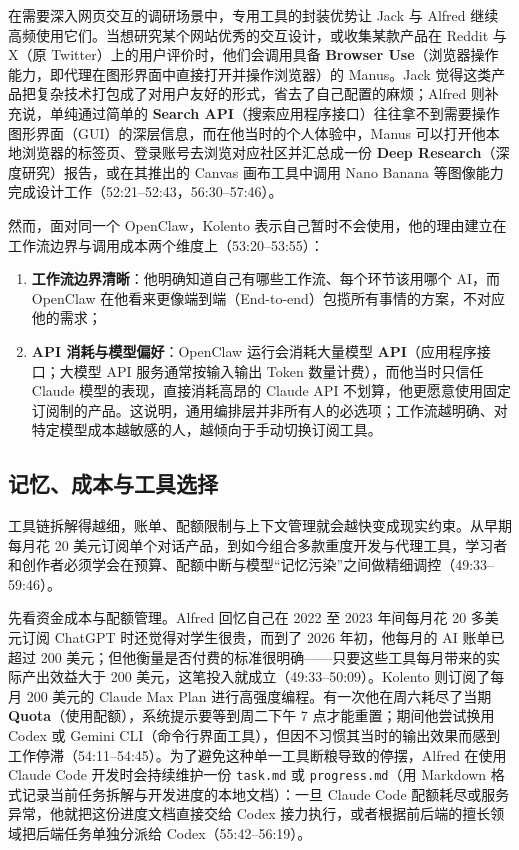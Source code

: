 \documentclass[UTF8,a4paper,11pt,fontset=fandol]{ctexart}
\begin{document}
在需要深入网页交互的调研场景中，专用工具的封装优势让 Jack 与 Alfred 继续高频使用它们。当想研究某个网站优秀的交互设计，或收集某款产品在 Reddit 与 X（原 Twitter）上的用户评价时，他们会调用具备 \textbf{Browser Use}（浏览器操作能力，即代理在图形界面中直接打开并操作浏览器）的 Manus。Jack 觉得这类产品把复杂技术打包成了对用户友好的形式，省去了自己配置的麻烦；Alfred 则补充说，单纯通过简单的 \textbf{Search API}（搜索应用程序接口）往往拿不到需要操作图形界面（GUI）的深层信息，而在他当时的个人体验中，Manus 可以打开他本地浏览器的标签页、登录账号去浏览对应社区并汇总成一份 \textbf{Deep Research}（深度研究）报告，或在其推出的 Canvas 画布工具中调用 Nano Banana 等图像能力完成设计工作（52:21–52:43，56:30–57:46）。

然而，面对同一个 OpenClaw，Kolento 表示自己暂时不会使用，他的理由建立在工作流边界与调用成本两个维度上（53:20–53:55）：
\begin{enumerate}
\item \textbf{工作流边界清晰}：他明确知道自己有哪些工作流、每个环节该用哪个 AI，而 OpenClaw 在他看来更像端到端（End-to-end）包揽所有事情的方案，不对应他的需求；
\item \textbf{API 消耗与模型偏好}：OpenClaw 运行会消耗大量模型 \textbf{API}（应用程序接口；大模型 API 服务通常按输入输出 Token 数量计费），而他当时只信任 Claude 模型的表现，直接消耗高昂的 Claude API 不划算，他更愿意使用固定订阅制的产品。这说明，通用编排层并非所有人的必选项；工作流越明确、对特定模型成本越敏感的人，越倾向于手动切换订阅工具。
\end{enumerate}

\subsection{记忆、成本与工具选择}
工具链拆解得越细，账单、配额限制与上下文管理就会越快变成现实约束。从早期每月花 20 美元订阅单个对话产品，到如今组合多款重度开发与代理工具，学习者和创作者必须学会在预算、配额中断与模型“记忆污染”之间做精细调控（49:33–59:46）。

先看资金成本与配额管理。Alfred 回忆自己在 2022 至 2023 年间每月花 20 多美元订阅 ChatGPT 时还觉得对学生很贵，而到了 2026 年初，他每月的 AI 账单已超过 200 美元；但他衡量是否付费的标准很明确——只要这些工具每月带来的实际产出效益大于 200 美元，这笔投入就成立（49:33–50:09）。Kolento 则订阅了每月 200 美元的 Claude Max Plan 进行高强度编程。有一次他在周六耗尽了当期 \textbf{Quota}（使用配额），系统提示要等到周二下午 7 点才能重置；期间他尝试换用 Codex 或 Gemini CLI（命令行界面工具），但因不习惯其当时的输出效果而感到工作停滞（54:11–54:45）。为了避免这种单一工具断粮导致的停摆，Alfred 在使用 Claude Code 开发时会持续维护一份 \texttt{task.md} 或 \texttt{progress.md}（用 Markdown 格式记录当前任务拆解与开发进度的本地文档）：一旦 Claude Code 配额耗尽或服务异常，他就把这份进度文档直接交给 Codex 接力执行，或者根据前后端的擅长领域把后端任务单独分派给 Codex（55:42–56:19）。
\end{document}
